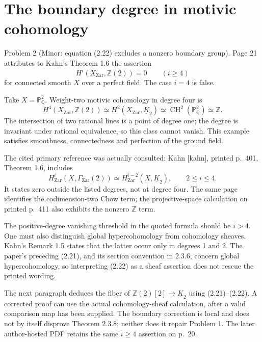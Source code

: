 \documentclass[10pt]{article}
\begin{document}
\section*{The boundary degree in motivic cohomology}
Problem 2 (Minor: equation (2.22) excludes a nonzero boundary group).  Page 21 attributes to Kahn’s Theorem 1.6 the assertion \[H^i(X_{\mathrm{Zar}},\mathbb Z(2))=0\qquad(i\geq4)
 \tag{2.22}\] for connected smooth \(X\) over a perfect field. The case \(i=4\) is false.\par
Take \(X=\mathbb P^2_{\mathbb Q}\). Weight-two motivic cohomology in degree four is \[H^4(X_{\mathrm{Zar}},\mathbb Z(2))\simeq
 H^2(X_{\mathrm{Zar}},\underline K_2)
 \simeq\operatorname{CH}^2(\mathbb P^2_{\mathbb Q})\simeq\mathbb Z.\] The intersection of two rational lines is a point of degree one; the degree is invariant under rational equivalence, so this class cannot vanish. This example satisfies smoothness, connectedness and perfection of the ground field.\par
The cited primary reference was actually consulted: Kahn [kahn], printed p. 401, Theorem 1.6, includes \[H^i_{\mathrm{Zar}}(X,\Gamma_{\mathrm{Zar}}(2))
   \simeq H^{i-2}_{\mathrm{Zar}}(X,\underline K_2),
       \qquad 2\leq i\leq4.\] It states zero outside the listed degrees, not at degree four. The same page identifies the codimension-two Chow term; the projective-space calculation on printed p. 411 also exhibits the nonzero \(\mathbb Z\) term.\par
The positive-degree vanishing threshold in the quoted formula should be \(i>4\). One must also distinguish global hypercohomology from cohomology sheaves. Kahn’s Remark 1.5 states that the latter occur only in degrees 1 and 2. The paper’s preceding (2.21), and its section convention in 2.3.6, concern global hypercohomology, so interpreting (2.22) as a sheaf assertion does not rescue the printed wording.\par
The next paragraph deduces the fiber of \(\mathbb Z(2)[2]\to\underline K_2\) using (2.21)–(2.22). A corrected proof can use the actual cohomology-sheaf calculation, after a valid comparison map has been supplied. The boundary correction is local and does not by itself disprove Theorem 2.3.8; neither does it repair Problem 1. The later author-hosted PDF retains the same \(i\geq4\) assertion on p. 20.\par
\end{document}
